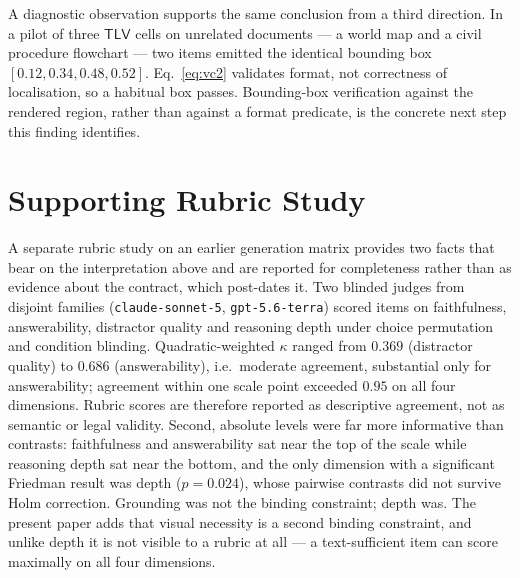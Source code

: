 \documentclass[conference]{IEEEtran}
\newcommand{\TLV}{\mathsf{TLV}}
\begin{document}
A diagnostic observation supports the same conclusion from a third direction. In a
pilot of three $\TLV$ cells on unrelated documents --- a world map and a civil
procedure flowchart --- two items emitted the identical bounding box
$[0.12,0.34,0.48,0.52]$. Eq.~\eqref{eq:vc2} validates format, not correctness of
localisation, so a habitual box passes. Bounding-box verification against the
rendered region, rather than against a format predicate, is the concrete next step
this finding identifies.

\section{Supporting Rubric Study}
\label{sec:judge}
A separate rubric study on an earlier generation matrix provides two facts that
bear on the interpretation above and are reported for completeness rather than as
evidence about the contract, which post-dates it. Two blinded judges from
disjoint families (\texttt{claude-sonnet-5}, \texttt{gpt-5.6-terra}) scored items
on faithfulness, answerability, distractor quality and reasoning depth under choice
permutation and condition blinding. Quadratic-weighted $\kappa$ ranged from
$0.369$ (distractor quality) to $0.686$ (answerability), i.e.\ moderate agreement,
substantial only for answerability; agreement within one scale point exceeded
$0.95$ on all four dimensions. Rubric scores are therefore reported as descriptive
agreement, not as semantic or legal validity. Second, absolute levels were far more
informative than contrasts: faithfulness and answerability sat near the top of the
scale while reasoning depth sat near the bottom, and the only dimension with a
significant Friedman result was depth ($p=0.024$), whose pairwise contrasts did not
survive Holm correction. Grounding was not the binding constraint; depth was. The
present paper adds that visual necessity is a second binding constraint, and unlike
depth it is not visible to a rubric at all --- a text-sufficient item can score
maximally on all four dimensions.
\end{document}
